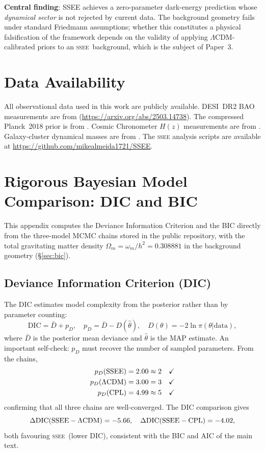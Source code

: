 \documentclass[12pt,a4paper]{article}
\newcommand{\SSEE}{\ifmmode\mathrm{SSEE}\else\textsc{ssee}\fi}
\newcommand{\LCDM}{\ifmmode\Lambda\mathrm{CDM}\else$\Lambda$CDM\fi}
\begin{document}
\noindent\textbf{Central finding}: SSEE achieves a zero-parameter
dark-energy prediction whose \emph{dynamical sector} is not rejected by current data.
The background geometry fails under standard Friedmann assumptions;
whether this constitutes a physical falsification of the framework depends on
the validity of applying \LCDM-calibrated priors to an \SSEE\ background,
which is the subject of Paper~3.

\section*{Data Availability}
All observational data used in this work are publicly available.
DESI~DR2 BAO measurements are from \citet{DESI_DR2}
(\url{https://arxiv.org/abs/2503.14738}).
The compressed Planck~2018 prior is from \citet{Planck2018}.
Cosmic Chronometer $H(z)$ measurements are from \citet{Moresco2022}.
Galaxy-cluster dynamical masses are from \citet{Zhang2026}.
The \textsc{ssee} analysis scripts are available at
\url{https://github.com/mikealmeida1721/SSEE}.

\appendix
\section{Rigorous Bayesian Model Comparison: DIC and BIC}
\label{app:dic}

\noindent
This appendix computes the Deviance Information Criterion and the BIC directly
from the three-model MCMC chains stored in the public repository, with the total
gravitating matter density $\Omega_m=\omega_m/h^2=0.308881$ in the background
geometry (§\ref{sec:bic}).

\subsection*{Deviance Information Criterion (DIC)}

The DIC \citep{Spiegelhalter2002} estimates model complexity from the posterior
rather than by parameter counting:
\begin{equation}
  \mathrm{DIC} = \bar{D} + p_D,\quad
  p_D = \bar{D} - D(\hat\theta),\quad
  D(\theta) = -2\ln\pi(\theta|\mathrm{data}),
\end{equation}
where $\bar{D}$ is the posterior mean deviance and $\hat\theta$ is the MAP
estimate. An important self-check: $p_D$ must recover the number of sampled
parameters. From the chains,
\begin{align}
  p_D(\mathrm{SSEE}) &= 2.00 \approx 2\quad\checkmark \\
  p_D(\mathrm{\LCDM}) &= 3.00 = 3\quad\checkmark \\
  p_D(\mathrm{CPL})  &= 4.99 \approx 5\quad\checkmark
\end{align}
confirming that all three chains are well-converged. The DIC comparison gives
\begin{equation}
  \Delta\mathrm{DIC}(\mathrm{SSEE}-\mathrm{\LCDM}) = -5.66,\quad
  \Delta\mathrm{DIC}(-\mathrm{CPL}) = -4.02,
\end{equation}
both favouring \SSEE\ (lower DIC), consistent with the BIC and AIC of the
main text.
\end{document}
